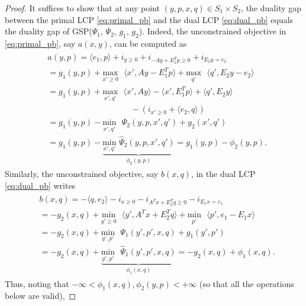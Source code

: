 \documentclass[a4paper,9pt]{extarticle}
\begin{document}
\begin{proof}
It suffices to show that at any point $(y, p, x,
q) \in S_1 \times S_2$, the duality gap between the primal
LCP \eqref{eq:primal_pb} and the dual LCP \eqref{eq:dual_pb} equals
the duality gap of GSP($\Psi_1$, $\Psi_2$, $g_1$, $g_2$).
Indeed, the unconstrained objective in \eqref{eq:primal_pb}, say
$a(x,y)$, can be computed as
\begin{eqnarray*}
  \begin{aligned}
    &a(y,p) = \langle e_1,p\rangle + i_{y\ge 0} + i_{-Ay + E_1^Tp \ge 0} +
    i_{E_2y = e_2}\\
    &= g_1(y,p) + \underset{x' \geq
      0}{\text{max}}\text{ }\langle x',Ay - E_1^Tp\rangle +
    \underset{q'}{\text{max}}\text{ }\langle q',E_2y - e_2\rangle\\
    &= g_1(y,p) + \underset{x',
      q'}{\text{max}}\text{ }\langle x',Ay\rangle - \langle x',
    E_1^Tp\rangle + \langle q',E_2y\rangle\\
    &\hspace{10em}-
    (i_{x' \ge 0} + \langle e_2,q\rangle)\\
    &= g_1(y,p)
      - \underset{x',q'}{\text{min}}\text{ }\Psi_2(y, p, x', q') + g_2(x',
      q')\\
      &= g_1(y,p)
      - \underbrace{\underset{x',q'}{\text{min}}\text{
        }\hat{\Psi}_2(y, p, x', q')}_{\phi_2(y,p)}
      = g_1(y, p) - \phi_2(y, p).
  \end{aligned}
  \label{eq:a}
\end{eqnarray*}
Similarly, the unconstrained objective, say
$b(x, q)$, in the dual LCP \eqref{eq:dual_pb} writes
\begin{eqnarray*}
  \begin{aligned}
&b(x, q) = 
-\langle q, e_2\rangle -i_{x \ge 0} - i_{A^Tx+E_2^Tq \ge 0} -
 i_{E_1x = e_1}\\
 &= -g_2(x, q) + \underset{y' \geq
   0}{\text{min}}\text{ }\langle y', A^Tx + E_2^Tq\rangle +
 \underset{p'}{\text{min}}\text{ }\langle p', e_1-E_1x\rangle\\
    &= -g_2(x, q)
 +\underset{y',p'}{\text{min}}\text{ }\Psi_1(y', p', x, q) +
 g_1(y', p')\\
& = -g_2(x, q) +
 \underbrace{\underset{y',p'}{\text{min}}\text{ }\hat{\Psi}_1(y', p',
   x, q)}_{\phi_1(x, q)} = -g_2(x, q) + \phi_1(x, q). 
   \end{aligned}
\end{eqnarray*}
Thus, noting that $-\infty < \phi_1(x, q), \phi_2(y, p) < +\infty$
(so that all the operations below are valid),

\end{proof}
\end{document}

